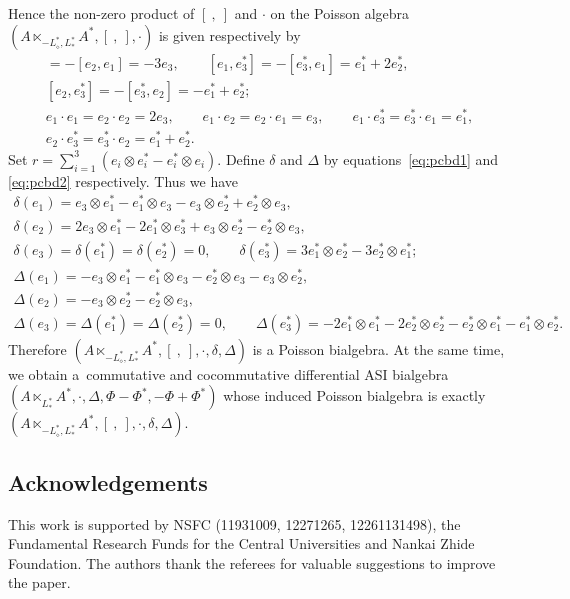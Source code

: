 \documentclass[10pt,a4paper]{amsart}
\numberwithin{equation}{section}
\begin{document}
\begin{Example}
\begin{equation*}
 \end{equation*}
 Hence the non-zero product of $[\ ,\ ]$ and $\cdot$ on the Poisson algebra $(A \ltimes_{-L^*_{\diamond},L^*_{\ast}} A^*, [\ ,\ ], \cdot)$ is given respectively by
 \begin{gather*}
 [e_1, e_2] = -[e_2, e_1] = -3e_3, \qquad
 [e_1, e_3^*] = -[e_3^*, e_1] = e_1^* + 2 e_2^*, \\
 [e_2, e_3^*] = -[e_3^*, e_2] = -e_1^* + e_2^*;\\
 e_1 \cdot e_1 = e_2 \cdot e_2 = 2 e_3, \qquad
 e_1 \cdot e_2 = e_2 \cdot e_1 = e_3, \qquad
 e_1 \cdot e_3^* = e_3^* \cdot e_1 = e_1^*, \\
 e_2 \cdot e_3^* = e_3^* \cdot e_2 = e_1^* + e_2^*.
 \end{gather*}
 Set $r = \sum_{i=1}^3 (e_i \otimes e_i^* - e_i^* \otimes e_i)$.
 Define $\delta$ and $\Delta$ by equations~\eqref{eq:pcbd1} and \eqref{eq:pcbd2} respectively.
 Thus we have
 \begin{gather*}
 \delta(e_1) = e_3 \otimes e_1^* - e_1^* \otimes e_3 - e_3 \otimes e_2^* + e_2^* \otimes e_3, \\
 \delta(e_2) = 2 e_3 \otimes e_1^* - 2 e_1^* \otimes e_3^* + e_3 \otimes e_2^* - e_2^* \otimes e_3,\\
 \delta(e_3) = \delta(e_1^*) = \delta(e_2^*) = 0, \qquad \delta(e_3^*) = 3 e_1^* \otimes e_2^* - 3 e_2^* \otimes e_1^*;\\
 \Delta(e_1) = - e_3 \otimes e_1^* - e_1^* \otimes e_3 - e_2^* \otimes e_3 - e_3 \otimes e_2^*, \\
 \Delta(e_2) = - e_3 \otimes e_2^* - e_2^* \otimes e_3, \\
 \Delta(e_3) = \Delta(e_1^*) = \Delta(e_2^*) = 0, \qquad \Delta(e_3^*) = -2 e_1^* \otimes e_1^* -2 e_2^* \otimes e_2^* - e_2^* \otimes e_1^* - e_1^* \otimes e_2^*.
 \end{gather*}
 Therefore $(A \ltimes_{-L^*_{\diamond},L^*_{\ast}} A^*, [\ ,\ ], \cdot, \delta, \Delta)$ is a Poisson bialgebra.
At the same time, we obtain a~commutative and cocommutative differential ASI bialgebra $(A \ltimes_{L^*_{\ast}} A^*, \cdot, \Delta, \Phi - \Phi^*, -\Phi + \Phi^*)$
 whose induced Poisson bialgebra is exactly $(A \ltimes_{-L^*_{\diamond},L^*_{\ast}} A^*, [\ ,\ ], \cdot, \delta,\Delta)$.
\end{Example}

\subsection*{Acknowledgements}
This work is supported by NSFC (11931009, 12271265, 12261131498), the Fundamental Research Funds for the Central Universities and Nankai Zhide Foundation.
The authors thank the referees for valuable suggestions to improve the paper.
\end{document}
